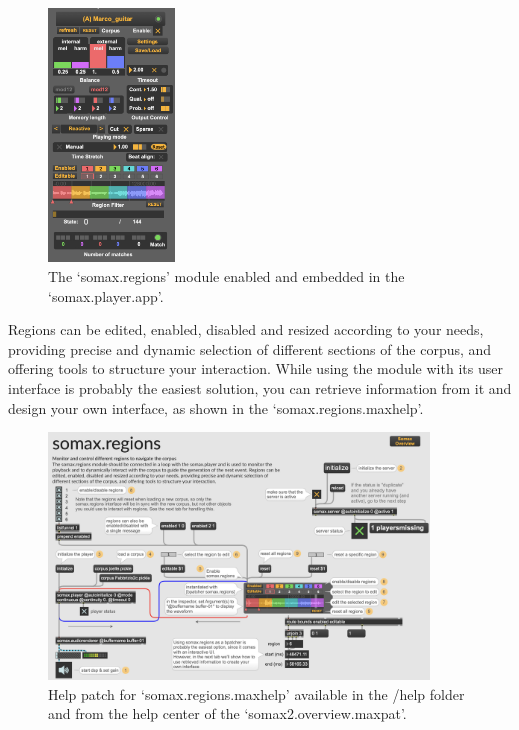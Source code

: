 \begin{figure}[H]
    \centering        
 	\includegraphics[width=0.3\textwidth, trim=0 0 0 5, clip, keepaspectratio]{somax2-6-user-guide/img/player_compact_regions.png}
    \caption{The `somax.regions' module enabled and embedded in the `somax.player.app'.}
    \label{fig:player_regions}
\end{figure}

Regions can be edited, enabled, disabled and resized according to your needs, providing precise and dynamic selection of different sections of the corpus, and offering tools to structure your interaction. 
While using the module with its user interface is probably the easiest solution, you can retrieve information from it and design your own interface, as shown in the `somax.regions.maxhelp'.

\begin{figure}[H]
    \centering        
 	\includegraphics[width=0.9\textwidth, keepaspectratio]{somax2-6-user-guide/img/regions_help.png}
    \caption{Help patch for `somax.regions.maxhelp' available in the /help folder and from the help center of the `somax2.overview.maxpat'.}
    \label{fig:regions_help}
\end{figure}


